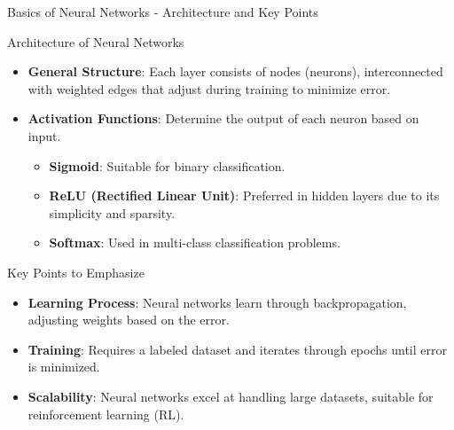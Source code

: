 \documentclass[aspectratio=169]{beamer}
\begin{document}
\begin{frame}[fragile]{Basics of Neural Networks - Architecture and Key Points}
    \begin{block}{Architecture of Neural Networks}
        \begin{itemize}
            \item \textbf{General Structure}: Each layer consists of nodes (neurons), interconnected with weighted edges that adjust during training to minimize error.
            \item \textbf{Activation Functions}: Determine the output of each neuron based on input.
            \begin{itemize}
                \item \textbf{Sigmoid}: Suitable for binary classification.
                \item \textbf{ReLU (Rectified Linear Unit)}: Preferred in hidden layers due to its simplicity and sparsity.
                \item \textbf{Softmax}: Used in multi-class classification problems.
            \end{itemize}
        \end{itemize}
    \end{block}

    \begin{block}{Key Points to Emphasize}
        \begin{itemize}
            \item \textbf{Learning Process}: Neural networks learn through backpropagation, adjusting weights based on the error.
            \item \textbf{Training}: Requires a labeled dataset and iterates through epochs until error is minimized.
            \item \textbf{Scalability}: Neural networks excel at handling large datasets, suitable for reinforcement learning (RL).
        \end{itemize}
    \end{block}
\end{frame}
\end{document}
